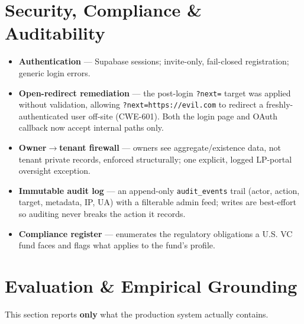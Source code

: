 \documentclass[11pt]{article}
\begin{document}
\section{Security, Compliance \& Auditability}
\begin{itemize}[leftmargin=1.2em]
\item \textbf{Authentication} --- Supabase sessions; invite-only, fail-closed
registration; generic login errors.
\item \textbf{Open-redirect remediation} --- the post-login \texttt{?next=} target
was applied without validation, allowing \texttt{?next=https://evil.com} to
redirect a freshly-authenticated user off-site (CWE-601). Both the login page and
OAuth callback now accept internal paths only.
\item \textbf{Owner$\to$tenant firewall} --- owners see aggregate/existence data,
not tenant private records, enforced structurally; one explicit, logged LP-portal
oversight exception.
\item \textbf{Immutable audit log} --- an append-only \texttt{audit\_events} trail
(actor, action, target, metadata, IP, UA) with a filterable admin feed; writes are
best-effort so auditing never breaks the action it records.
\item \textbf{Compliance register} --- enumerates the regulatory obligations a U.S.
VC fund faces and flags what applies to the fund's profile.
\end{itemize}

\section{Evaluation \& Empirical Grounding}
This section reports \textbf{only} what the production system actually contains.
\end{document}
